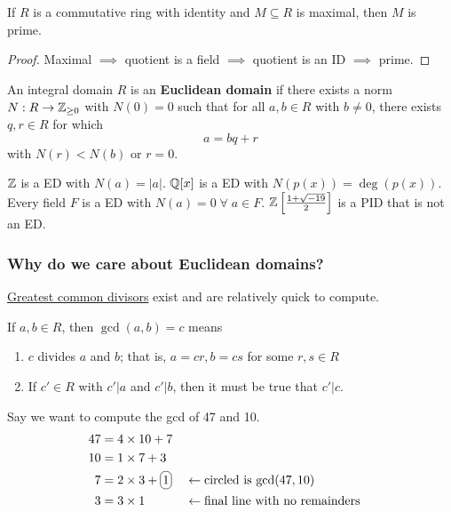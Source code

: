 \documentclass[12pt]{article}
\begin{document}
\begin{corollary}
    If $R$ is a commutative ring with identity and $M\subseteq R$ is maximal, then $M$ is prime.
\end{corollary}
\begin{proof}
    Maximal $\implies$ quotient is a field $\implies$ quotient is an ID $\implies$ prime.
\end{proof}

 An integral domain $R$ is an \textbf{Euclidean domain} if there exists a norm $N: R\to \mathbb{Z}_{\geq 0}$ with $N(0)=0$ such that for all $a,b\in R$ with $b\neq 0$, there exists $q,r\in R$ for which $$a=bq+r$$ with $N(r)<N(b)$ or $r=0$.

\eg $\mathbb{Z}$ is a ED with $N(a)=|a|$.
\eg $\mathbb{Q}[x]$ is a ED with $N(p(x))=\deg (p(x))$.
\eg Every field $F$ is a ED with $N(a)=0\;\forall\; a\in F$.
\noneg $\mathbb{Z}\left[\frac{1+\sqrt{-19}}{2}\right]$ is a PID that is not an ED.

\subsubsection{Why do we care about Euclidean domains?}
\rmk \underline{Greatest common divisors} exist and are relatively quick to compute. 

 If $a,b\in R$, then $\gcd (a,b)=c$ means \begin{enumerate}
    \item $c$ divides $a$ and $b$; that is, $a=cr, b=cs$ for some $r,s\in R$
    \item If $c'\in R$ with $c'|a$ and $c'|b$, then it must be true that $c'|c$.
\end{enumerate}

\eg Say we want to compute the gcd of 47 and 10.
\begin{align*}
    47 &= 4\times 10 + 7\\
    10 &= 1\times 7 + 3\\
    7 &= 2\times 3 + \circled{1} && \leftarrow \text{circled is gcd}(47,10)\\
    3 &= 3\times 1 && \leftarrow \text{final line with no remainders}
\end{align*}
\end{document}
